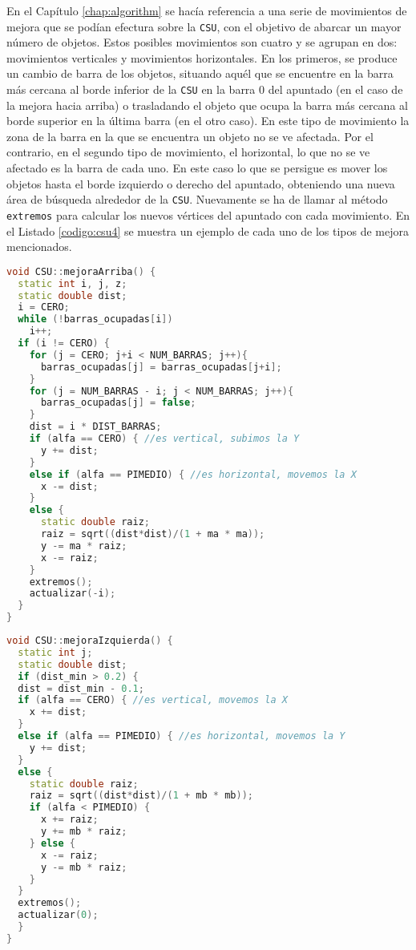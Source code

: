 En el Capítulo \ref{chap:algorithm} se hacía referencia a una serie de movimientos de mejora
que se podían efectura sobre la \texttt{CSU}, con el objetivo de abarcar un mayor número de objetos.
Estos posibles movimientos son cuatro y se agrupan en dos: movimientos
verticales y movimientos horizontales. En los primeros, se produce un cambio de
barra de los objetos, situando aquél que se encuentre en la barra más cercana al
borde inferior de la \texttt{CSU} en la barra 0 del apuntado (en el caso de la mejora
hacia arriba) o trasladando el objeto que ocupa la barra más cercana al borde
superior en la última barra (en el otro caso). En este tipo de movimiento la
zona de la barra en la que se encuentra un objeto no se ve afectada. Por el
contrario, en el segundo tipo de movimiento, el horizontal, lo que no se ve
afectado es la barra de cada uno. En este caso lo que se persigue es mover los
objetos hasta el borde izquierdo o derecho del apuntado, obteniendo una nueva
área de búsqueda alrededor de la \texttt{CSU}. Nuevamente se ha de llamar al método
\texttt{extremos} para calcular los nuevos vértices del apuntado con cada
movimiento. En el Listado \ref{codigo:csu4} se muestra un ejemplo de cada uno de
los tipos de mejora mencionados.

\begin{lstlisting}[float=tpb,
                   language=C++, basicstyle=\ttfamily\footnotesize, 
                   caption={Código del movimiento de mejora vertical hacia arriba},
                   label={codigo:csu4}]
void CSU::mejoraArriba() {
  static int i, j, z;
  static double dist;
  i = CERO;
  while (!barras_ocupadas[i])
    i++;
  if (i != CERO) {
    for (j = CERO; j+i < NUM_BARRAS; j++){
      barras_ocupadas[j] = barras_ocupadas[j+i];
    }
    for (j = NUM_BARRAS - i; j < NUM_BARRAS; j++){
      barras_ocupadas[j] = false;
    }
    dist = i * DIST_BARRAS;
    if (alfa == CERO) { //es vertical, subimos la Y
      y += dist;
    }
    else if (alfa == PIMEDIO) { //es horizontal, movemos la X
      x -= dist;
    }
    else {
      static double raiz;
      raiz = sqrt((dist*dist)/(1 + ma * ma));
      y -= ma * raiz;
      x -= raiz;
    }
    extremos();
    actualizar(-i);
  }
}
\end{lstlisting}

\begin{lstlisting}[float=tpb,
                   language=C++, basicstyle=\ttfamily\footnotesize,
                   caption={Código del movimiento de mejora horizontal izquierdo},
                   label={codigo:csu5}]
void CSU::mejoraIzquierda() {
  static int j;
  static double dist;
  if (dist_min > 0.2) {
  dist = dist_min - 0.1;
  if (alfa == CERO) { //es vertical, movemos la X
    x += dist;
  }
  else if (alfa == PIMEDIO) { //es horizontal, movemos la Y
    y += dist;
  }
  else {
    static double raiz;
    raiz = sqrt((dist*dist)/(1 + mb * mb));
    if (alfa < PIMEDIO) {
      x += raiz;
      y += mb * raiz;
    } else {
      x -= raiz;
      y -= mb * raiz;
    }
  }
  extremos();
  actualizar(0);
  }
}
\end{lstlisting}

